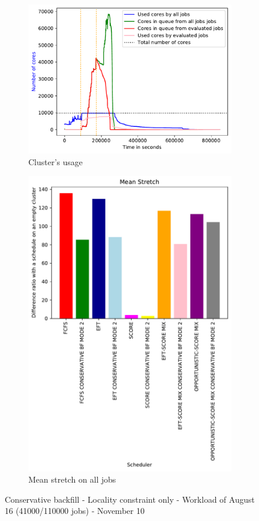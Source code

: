 \documentclass[a4paper]{article}
\begin{document}
\begin{figure}[H]\centering
\begin{subfigure}[b]{0.4\linewidth}\centering\includegraphics[width=1\linewidth]{MBSS/plot/2022-08-16->2022-08-16_V9271_Fcfs_Used_nodes_450_128_32_256_4_1024.pdf}\caption{Cluster's usage}\end{subfigure}
\begin{subfigure}[b]{0.4\linewidth}\centering\includegraphics[width=0.9\linewidth]{MBSS/plot/Results_FCFS_Score_Backfill_2022-08-16->2022-08-16_V9271_Mean_Stretch_450_128_32_256_4_1024.pdf}\caption{Mean stretch on all jobs}\end{subfigure}
\caption{Conservative backfill - Locality constraint only - Workload of August 16 (41000/110000 jobs) - November 10}\end{figure}
\end{document}
